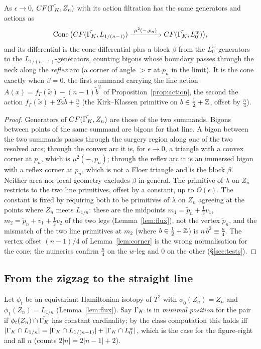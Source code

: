 \begin{proposition}\label{prop:zigzag}
As $\epsilon\to0$, $CF(\tilde{\Gamma_K},Z_n)$ with its action filtration has the same generators and actions as
\[
\Cone\big(CF(\tilde\Gam,L_{1/(n-1)})\xrightarrow{\ \mu^2(-,p_n)\ }CF(\tilde\Gam,L^w_0)\big),
\]
and its differential is the cone differential plus a block $\beta$ from the $L^w_0$-generators to the
$L_{1/(n-1)}$-generators, counting bigons whose boundary passes through the neck along the \emph{reflex} arc (a
corner of angle $>\pi$ at $p_n$ in the limit).  It is the cone exactly when $\beta=0$.
the first summand carrying the line action $A(x)=f_\Gamma(\tilde x)-(n-1)\tilde b^2$ of Proposition~\ref{prop:action},
the second the action $f_\Gamma(\tilde x)+2\tilde a\tilde b+\tfrac n4$ (the Kirk--Klassen primitive on $b\in\tfrac12+\mathbb{Z}$,
offset by $\tfrac n4$).
\end{proposition}
\begin{proof}
Generators of $CF(\tilde{\Gamma_K},Z_n)$ are those of the two summands.  Bigons between points of the same summand are
bigons for that line.  A bigon between the two summands passes through the surgery region along one of the two
resolved arcs; through the convex arc it is, for $\epsilon\to0$, a triangle with a convex corner at $p_n$, which is
$\mu^2(-,p_n)$; through the reflex arc it is an immersed bigon with a reflex corner at $p_n$, which is not a Floer
triangle and is the block $\beta$.  Neither area nor local geometry excludes $\beta$ in general.  The primitive of
$\lambda$ on $Z_n$ restricts to the two line primitives, offset by a constant, up to $O(\epsilon)$.  The constant is fixed by requiring both to be primitives of $\lambda$
on $Z_n$ agreeing at the points where $Z_n$ meets $L_{1/n}$: these are the midpoints $m_1=\tilde p_n+\tfrac12v_1$,
$m_2=\tilde p_n+v_1+\tfrac12v_2$ of the two legs (Lemma~\ref{lem:flux}), not the vertex $\tilde p_n$, and the
mismatch of the two line primitives at $m_2$ (where $b\in\tfrac12+\mathbb{Z}$) is $n\,b^2\equiv\tfrac n4$.  The vertex offset
$(n-1)/4$ of Lemma~\ref{lem:corner} is the wrong normalisation for the cone; the numerics confirm $\tfrac n4$ on the
$w$-leg and $0$ on the other (\S\ref{sec:tests}).
\end{proof}

\subsection{From the zigzag to the straight line}
Let $\phi_t$ be an equivariant Hamiltonian isotopy of $T^2$ with $\phi_0(Z_n)=Z_n$ and $\phi_1(Z_n)=L_{1/n}$
(Lemma~\ref{lem:flux}).  Say $\Gamma_K$ is in \emph{minimal position} for the pair if $\phi_t(Z_n)\cap\tilde{\Gamma_K}$ has
constant cardinality; by the class computation this holds iff
$|\Gamma_K\cap L_{1/n}|=|\Gamma_K\cap L_{1/(n-1)}|+|\Gamma_K\cap L^w_0|$, which is the case for the figure-eight and all
$n$ (counts $2|n|=2|n-1|+2$).

